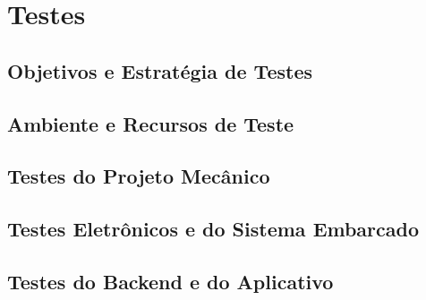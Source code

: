 
\chapter{Testes}
\label{chap:testes}


\section{Objetivos e Estratégia de Testes}
\label{sec:objetivos-testes}


\section{Ambiente e Recursos de Teste}
\label{sec:ambiente-testes}


\section{Testes do Projeto Mecânico}
\label{sec:testes-mecanicos}

%

\section{Testes Eletrônicos e do Sistema Embarcado}
\label{sec:testes-eletronicos-embarcados}


\section{Testes do Backend e do Aplicativo}
\label{sec:testes-backend-aplicativo}

